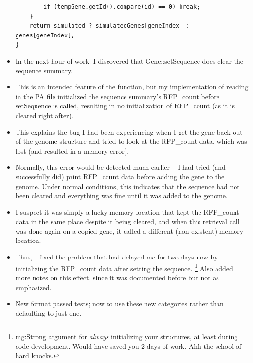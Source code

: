 \documentclass[12pt,hyperref]{labbook}
\begin{document}
\begin{itemize}
\begin{lstlisting}
		if (tempGene.getId().compare(id) == 0) break;
	}
	return simulated ? simulatedGenes[geneIndex] : genes[geneIndex];
}
    \end{lstlisting}
	\item In the next hour of work, I discovered that Gene::setSequence does clear the sequence summary.
	\item This is an intended feature of the function, but my implementation of reading in the PA file initialized the sequence summary's RFP\_count before setSequence is called, resulting in no initialization of RFP\_count (as it is cleared right after).
	\item This explains the bug I had been experiencing when I get the gene back out of the genome structure and tried to look at the RFP\_count data, which was lost (and resulted in a memory error).
	\item Normally, this error would be detected much earlier -- I had tried (and successfully did) print RFP\_count data before adding the gene to the genome.
	Under normal conditions, this indicates that the sequence had not been cleared and everything was fine until it was added to the genome.
	\item I suspect it was simply a lucky memory location that kept the RFP\_count data in the same place despite it being cleared, and when this retrieval call was done again on a copied gene, it called a different (non-existent) memory location.
	\item Thus, I fixed the problem that had delayed me for two days now by initializing the RFP\_count data after setting the sequence.
\footnote{mg:Strong argument for \emph{always} initializing your structures, at least during code development.
Would have saved you 2 days of work.
Ahh the school of hard knocks.
}
	Also added more notes on this effect, since it was documented before but not as emphasized.
	\item New format passed tests; now to use these new categories rather than defaulting to just one.
\end{itemize}

\end{document}
